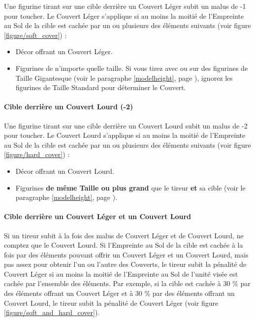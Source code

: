Une figurine tirant sur une cible derrière un Couvert Léger subit un malus de -1 pour toucher. Le Couvert Léger s'applique si au moins la moitié de l'Empreinte au Sol de la cible est cachée par un ou plusieurs des éléments suivants (voir figure \ref{figure/soft_cover}) :
\begin{itemize}[label={-}]
\item Décor offrant un Couvert Léger.
\item Figurines de n'importe quelle taille. Si vous tirez avec ou sur des figurines de Taille Gigantesque (voir le paragraphe \ref{modelheight}, page \pageref{modelheight}), ignorez les figurines de Taille Standard pour déterminer le Couvert.
\end{itemize}

\paragraph{Cible derrière un Couvert Lourd (-2)}

Une figurine tirant sur une cible derrière un Couvert Lourd subit un malus de -2 pour toucher. Le Couvert Lourd s'applique si au moins la moitié de l'Empreinte au Sol de la cible est cachée par un ou plusieurs des éléments suivants (voir figure \ref{figure/hard_cover}) :
\begin{itemize}[label={-}]
\item Décor offrant un Couvert Lourd.
\item Figurines \textbf{de même Taille ou plus grand} que le tireur \textbf{et} sa cible (voir le paragraphe \ref{modelheight}, page \pageref{modelheight}).
\end{itemize}

\paragraph{Cible derrière un Couvert Léger et un Couvert Lourd}

Si un tireur subit à la fois des malus de Couvert Léger et de Couvert Lourd, ne comptez que le Couvert Lourd. Si l'Empreinte au Sol de la cible est cachée à la fois par des éléments pouvant offrir un Couvert Léger et un Couvert Lourd, mais pas assez pour obtenir l'un ou l'autre des Couverts, le tireur subit la pénalité de Couvert Léger si au moins la moitié de l'Empreinte au Sol de l'unité visée est cachée par l'ensemble des éléments. Par exemple, si la cible est cachée à 30 \% par des éléments offrant un Couvert Léger et à 30 \% par des éléments offrant un Couvert Lourd, le tireur subit la pénalité de Couvert Léger (voir figure \ref{figure/soft_and_hard_cover}).

